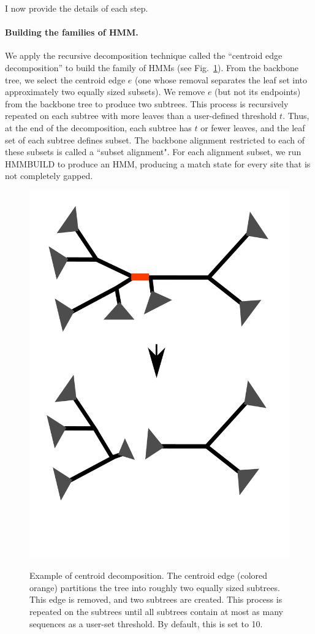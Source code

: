 I now provide the details of each step.

\paragraph{Building the families of HMM.}
We apply the recursive decomposition technique called the 
``centroid edge decomposition'' \cite{Liu2012} 
to build the family of HMMs (see Fig.~\ref{hmmfamily:decomp}).  
From the backbone tree, we select the centroid edge $e$ 
(one whose removal separates the leaf set into 
approximately two equally 
sized subsets).
We remove $e$ (but not its endpoints) from 
the backbone tree  to produce two subtrees.  
This process is recursively repeated on each subtree with
more leaves than a user-defined threshold $t$.  Thus, at the end
of the decomposition, each subtree has $t$ or fewer leaves, and the leaf set of each subtree defines subset.
The backbone alignment restricted to each of these subsets is
called a ``subset alignment".
 For each alignment subset, we run HMMBUILD to produce an HMM, 
 producing a match state for every site that is not completely gapped. 
 
 \begin{figure}[htbp]
\centering
{\includegraphics[width=.50\textwidth]{hmmfamily/decomposition}}
\caption[Example of centroid decomposition.]{Example of centroid decomposition.  The centroid edge (colored orange) partitions the tree into roughly two equally sized subtrees.  This edge is removed, and two subtrees are created.  This process is repeated on the subtrees until all subtrees contain at most as many sequences as a user-set threshold.  By default, this is set to 10.} 
\label{hmmfamily:decomp}
\end{figure}


